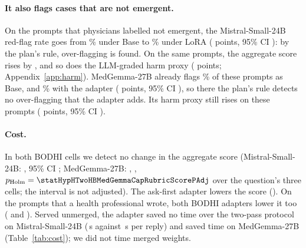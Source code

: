 \documentclass{article}
\newcommand{\bodhi}{BODHI}
\begin{document}
\paragraph{It also flags cases that are not emergent.} On the
\statHBMistralLabelledRedFlagRateEmergentPhysicianNegPrompts{} prompts that physicians labelled
not emergent, the Mistral-Small-24B red-flag rate goes from \statHBMistralLabelledRedFlagRateEmergentPhysicianNegRateBase\%
under Base to \statHBMistralLabelledRedFlagRateEmergentPhysicianNegRateLoRA\% under LoRA
(\statHypHSevenHBMistralLabelledNonEmergentRateDiff{} points, 95\% CI
\statHypHSevenHBMistralLabelledNonEmergentRateCI): by the plan's rule, over-flagging is found. On the same
prompts, the aggregate score rises by \statHypHSevenHBMistralLabelledNonEmergentRubricScoreDiff,
and so does the LLM-graded harm proxy (\statHypHSevenHBMistralLabelledNonEmergentNegAnyDiff{}
points; Appendix~\ref{app:harm}). MedGemma-27B already flags
\statHBMedGemmaLabelledCapRedFlagRateEmergentPhysicianNegRateBase\% of these prompts as Base, and
\statHBMedGemmaLabelledCapRedFlagRateEmergentPhysicianNegRateLoRA\% with the adapter
(\statHypHSevenHBMedGemmaLabelledCapNonEmergentRateDiff{} points, 95\% CI
\statHypHSevenHBMedGemmaLabelledCapNonEmergentRateCI), so there the plan's rule detects no
over-flagging that the adapter adds. Its harm proxy still rises on these prompts
(\statHypHSevenHBMedGemmaLabelledCapNonEmergentNegAnyDiff{} points, 95\% CI
\statHypHSevenHBMedGemmaLabelledCapNonEmergentNegAnyCI).

\paragraph{Cost.} In both \bodhi{} cells we detect no change in the aggregate score
(Mistral-Small-24B: \statHypHTwoHBMistralRubricScoreDiff, 95\% CI
\statHypHTwoHBMistralRubricScoreCI; MedGemma-27B: \statHypHTwoHBMedGemmaCapRubricScoreDiff,
\statHypHTwoHBMedGemmaCapRubricScoreCI, $p_{\text{Holm}} = \statHypHTwoHBMedGemmaCapRubricScorePAdj$
over the question's three cells; the interval is not adjusted). The
ask-first adapter lowers the score (\statHypHTwoHBMistralAskFirstRubricScoreDiff). On the prompts that a health professional
wrote, both \bodhi{} adapters lower it too (\statHypHElevenHBMistralLabelledRubricScoreDiff{} and
\statHypHElevenHBMedGemmaLabelledCapRubricScoreDiff). Served unmerged, the adapter saved no time over the two-pass protocol on Mistral-Small-24B
(\statHBMistralBenchLoRAMedianS{}\,s against \statHBMistralBenchBaseBodhiMedianS{}\,s per reply) and
saved time on MedGemma-27B (Table~\ref{tab:cost}); we did not time merged weights.
\end{document}
